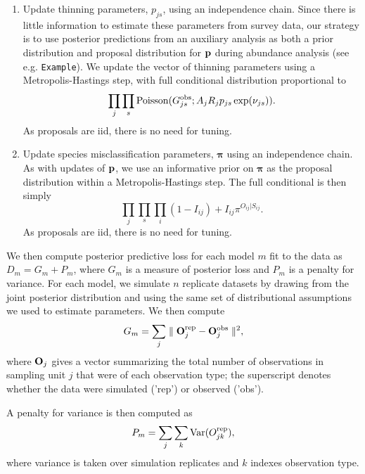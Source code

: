 \documentclass[12pt,fleqn]{article}
\begin{document}
\begin{flushleft}
\begin{enumerate}
  \item Update thinning parameters, $p_{js}$, using an independence chain.  Since there is little information to estimate these parameters from survey data, our strategy is to use posterior predictions from an auxiliary analysis as both a prior distribution and proposal distribution for ${\bf p}$ during abundance analysis (see e.g. \texttt{Example}).  We update the vector of thinning parameters using a Metropolis-Hastings step, with full conditional distribution proportional to \begin{equation*}
      \prod_j \prod_s {\rm Poisson}(G_{js}^{\rm obs};A_j R_j p_{js} \exp(\nu_{js})).
      \end{equation*}
      As proposals are iid, there is no need for tuning.\\

  \item Update species misclassification parameters, $\boldsymbol{\pi}$ using an independence chain.  As with
      updates of ${\bf p}$, we use an informative prior on $\boldsymbol{\pi}$ as the proposal distribution within a Metropolis-Hastings step.  The full conditional is then simply
      \begin{equation*}
        \prod_j \prod_s \prod_i (1-I_{ij})+I_{ij} \pi^{O_{ij}|S_{ij}}.
      \end{equation*}
          As proposals are iid, there is no need for tuning.
\end{enumerate}

We then compute posterior predictive loss for each model $m$ fit to the data as $D_m = G_m + P_m$,
where $G_m$ is a measure of posterior loss and $P_m$ is a penalty for variance.
For each model, we simulate $n$ replicate datasets by drawing from the joint posterior distribution and
using the same set of distributional assumptions we used to estimate parameters.  We then compute
\begin{equation*}
   G_m = \sum_j \parallel {\bf O}_{j}^{\rm rep} - {\bf O}_j^{\rm obs} \parallel ^2,
\end{equation*}
where ${\bf O}_{j}$ gives a vector summarizing the total number of observations in sampling unit $j$ that were
 of each observation type; the superscript denotes whether the data were simulated ('rep') or observed
 ('obs').

A penalty for variance is then computed as
\begin{equation*}
   P_m = \sum_j \sum_k {\rm Var}(O_{jk}^{\rm rep}),
\end{equation*}
where variance is taken over simulation replicates and $k$ indexes observation type.

\renewcommand{\refname}{Literature Cited}




\end{flushleft}
\end{document}
